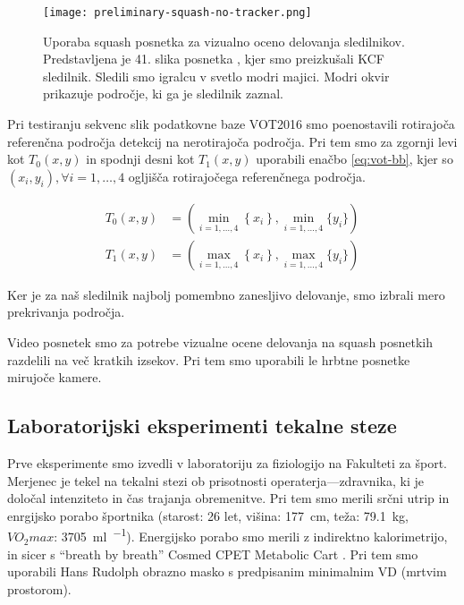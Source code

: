 \begin{figure}[htbp]
	\centering
	\texttt{[image: preliminary-squash-no-tracker.png]}
	\caption[Uporaba squash posnetka za vizualno oceno delovanja sledilnikov]{Uporaba squash posnetka za vizualno oceno delovanja sledilnikov. Predstavljena je 41. slika posnetka \cite{squashtv2014squash}, kjer smo preizkušali KCF sledilnik. Sledili smo igralcu v svetlo modri majici. Modri okvir prikazuje področje, ki ga je sledilnik zaznal.}
	\label{fig:testiranje-squash-1-kcf}
\end{figure}



Pri testiranju sekvenc slik podatkovne baze VOT2016 smo poenostavili rotirajoča referenčna področja detekcij na nerotirajoča področja. Pri tem smo za zgornji levi kot $T_0(x,y)$ in spodnji desni kot $T_1(x,y)$ uporabili enačbo \eqref{eq:vot-bb}, kjer so $\left( x_i, y_i\right), \forall i=1,\ldots,4$ ogljišča rotirajočega referenčnega področja. 

\begin{equation}
\begin{aligned}
T_0(x,y) &= \left( \min_{i = 1,\ldots,4}\left\{x_i \right\}, 
\min_{i=1,\ldots,4}\{y_i \} \right) \\
T_1(x,y) &= \left( \max_{i = 1,\ldots,4}\left\{x_i \right\}, 
\max_{i=1,\ldots,4}\{y_i \} \right)
\end{aligned}
\label{eq:vot-bb}
\end{equation}

Ker je za naš sledilnik najbolj pomembno zanesljivo delovanje, smo izbrali mero prekrivanja področja.


Video posnetek \cite{squashtv2014squash} smo za potrebe vizualne ocene delovanja na squash posnetkih razdelili na več kratkih izsekov. Pri tem smo uporabili le hrbtne posnetke mirujoče kamere. 







\subsection{Laboratorijski eksperimenti tekalne steze}
Prve eksperimente smo izvedli v laboratoriju za fiziologijo na Fakulteti za šport. Merjenec je tekel na tekalni stezi ob prisotnosti operaterja---zdravnika, ki je določal intenziteto in čas trajanja obremenitve. Pri tem smo merili srčni utrip in enrgijsko porabo športnika (starost: 26 let, višina: \SI{177}{\cm}, teža: \SI{79.1}{\kg}, $VO_2max$: \SI{3705}{\ml\per\min}). Energijsko porabo smo merili z indirektno kalorimetrijo, in sicer s ``breath by breath'' Cosmed CPET Metabolic Cart \cite{beaver1973line}. Pri tem smo uporabili Hans Rudolph obrazno masko s predpisanim minimalnim VD (mrtvim prostorom).



